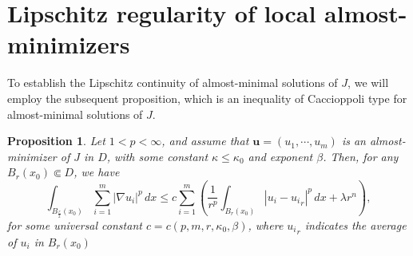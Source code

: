 \documentclass{amsart}
\newtheorem{proposition}[theorem]{Proposition}
\begin{document}
\section{Lipschitz regularity of  local almost-minimizers}
\label{S2+}

To establish the Lipschitz continuity of almost-minimal solutions of $J$, we will employ the subsequent proposition, which is an inequality of Caccioppoli type for almost-minimal solutions of $J$.


\begin{proposition}
\label{almost-minimizer-caccioppoli}
Let $1<p<\infty$, and assume that $\mathbf{u}=(u_1, \cdots,u_m)$ is an almost-minimizer of $J$ in $D$, with some constant $\kappa\le \kappa_0$ and exponent $\beta$. 
Then, 
for any $B_r(x_0) \Subset D$, we have  
\begin{equation}
\label{G-04.1}
\int_{B_{\frac{r}{2}}(x_0)} \sum_{i=1}^{m} |\nabla u_i|^p \, dx \leq c \sum_{i=1}^{m} \left( \frac{1}{r^p} \int_{B_r(x_0)} |u_i-{u_i}_r|^p \, dx + \lambda r^n \right),
\end{equation}
for some universal constant $c=c(p, m, r, \kappa_0, \beta)$, where ${u_i}_r$ indicates the average of $u_i$ in $B_{r}(x_0)$
\end{proposition}
\end{document}

